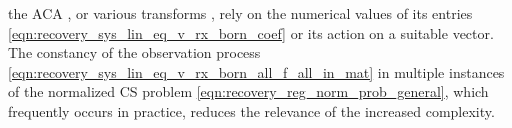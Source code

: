the \acl{ACA}
\cite{article:ZhaoITEC2005}, or
various transforms
\cite{article:DemanetFCompMath2010,article:DemanetACHA2007,article:ChewITAP1997}, rely on
the numerical values of
its entries
\eqref{eqn:recovery_sys_lin_eq_v_rx_born_coef} or
its action on
a suitable vector.
The constancy of
the observation process
\eqref{eqn:recovery_sys_lin_eq_v_rx_born_all_f_all_in_mat} in
multiple instances of
the normalized \ac{CS} problem
\eqref{eqn:recovery_reg_norm_prob_general}, which frequently occurs in
practice, reduces
the relevance of
the increased complexity.

